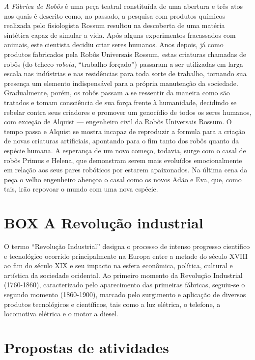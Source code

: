 \documentclass[11pt]{hedrabook}
\begin{document}
\textit{A Fábrica de Robôs} é uma peça teatral constituída de uma abertura e
três atos nos quais é descrito como, no passado, a pesquisa com produtos
químicos realizada pelo fisiologista Rossum resultou na descoberta de uma
matéria sintética capaz de simular a vida. Após alguns experimentos fracassados
com animais, este cientista decidiu criar seres humanos.  Anos depois, já como
produtos fabricados pela Robôs Universais Rossum, estas criaturas chamadas de
robôs (do tcheco \textit{robota}, “trabalho forçado”) passaram a ser utilizadas
em larga escala nas indústrias e nas residências para toda sorte de trabalho,
tornando sua presença um elemento indispensável para a própria manutenção da
sociedade.  Gradualmente, porém, os robôs passam a se ressentir da maneira como
são tratados e tomam consciência de sua força frente à humanidade, decidindo se
rebelar contra seus criadores e promover um genocídio de todos os seres
humanos, com exceção de Alquist  ---  engenheiro civil da Robôs Universais
Rossum. O tempo passa e Alquist se mostra incapaz de reproduzir a formula para
a criação de novas criaturas artificiais, apontando para o fim tanto dos robôs
quanto da espécie humana. A esperança de um novo começo, todavia, surge com o
casal de robôs Primus e Helena, que demonstram serem mais evoluídos
emocionalmente em relação aos seus pares robóticos por estarem apaixonados. Na
última cena da peça o velho engenheiro abençoa o casal como os novos Adão e
Eva, que, como tais, irão repovoar o mundo com uma nova espécie. 


\section{BOX A Revolução industrial}

O termo “Revolução Industrial” designa o processo de intenso progresso
científico e tecnológico ocorrido principalmente na Europa entre a metade do
século XVIII ao fim do século XIX e seu impacto na esfera econômica, política,
cultural e artística da sociedade ocidental. Ao primeiro momento da Revolução
Industrial (1760-1860), caracterizado pelo aparecimento das primeiras fábricas,
seguiu-se o segundo momento (1860-1900), marcado pelo surgimento e aplicação de
diversos produtos tecnológicos e científicos, tais como a luz elétrica, o
telefone, a locomotiva elétrica e o motor a diesel. 

\section{Propostas de atividades} 
\end{document}
